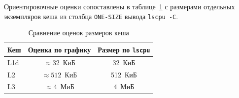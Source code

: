 Ориентировочные оценки сопоставлены в таблице~\ref{tab:cache-levels} с размерами отдельных экземпляров кеша из столбца \texttt{ONE-SIZE} вывода \texttt{lscpu -C}.

\begin{table}[H]
    \centering
    \caption{Сравнение оценок размеров кеша}
    \label{tab:cache-levels}
    \begin{tabular}{|l|c|c|}
        \hline
        Кеш & Оценка по графику & Размер по \texttt{lscpu} \\
        \hline
        L1d & $\approx 32$~КиБ  & 32~КиБ                   \\
        L2  & $\approx 512$~КиБ & 512~КиБ                  \\
        L3  & $\approx 4$~МиБ   & 4~МиБ                    \\
        \hline
    \end{tabular}
\end{table}
